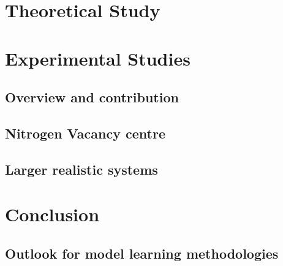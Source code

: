 \part{Theoretical Study}\label{part:theoretical_study}

\part{Experimental Studies}\label{part:experimental_study}
    \chapter*{Overview and contribution}
        
    \chapter{Nitrogen Vacancy centre}\label{chapter:nv}
        
    \chapter{Larger realistic systems}\label{chapter:many_qubits}
        
    
\part{Conclusion}\label{part:conclusion}
    \chapter{Outlook for model learning methodologies}\label{chapter:outlook}
        



